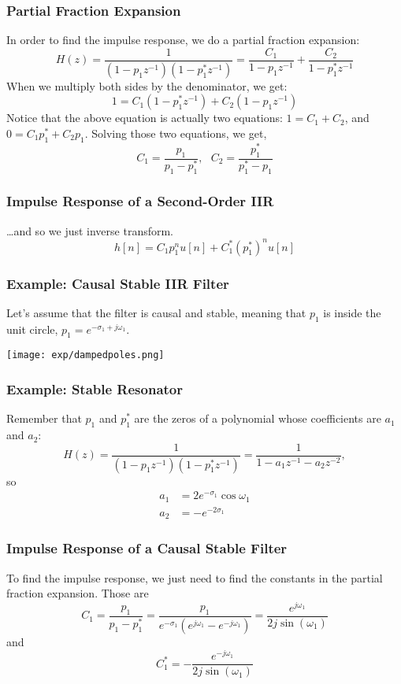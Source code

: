 \documentclass{beamer}
\begin{document}
\begin{frame}
  \frametitle{Partial Fraction Expansion}

  In order to find the impulse response, we do a partial fraction expansion:
  \[
  H(z) = \frac{1}{(1-p_1z^{-1})(1-p_1^*z^{-1})}= \frac{C_1}{1-p_1z^{-1}} + \frac{C_2}{1-p_1^*z^{-1}}
  \]
  When we multiply both sides by the denominator, we get:
  \begin{displaymath}
    1 = C_1(1-p_1^*z^{-1}) + C_2(1-p_1z^{-1})
  \end{displaymath}
  Notice that the above equation is actually two equations: $1=C_1+C_2$, and
  $0=C_1p_1^*+C_2p_1$.  Solving those two equations, we get,
  \begin{displaymath}
    C_1 = \frac{p_1}{p_1-p_1^*},~~~
    C_2 = \frac{p_1^*}{p_1^*-p_1}
  \end{displaymath}
\end{frame}

\begin{frame}
  \frametitle{Impulse Response of a Second-Order IIR}

  \ldots and so we just inverse transform.
  \[
  h[n] = C_1p_1^n u[n] + C_1^* (p_1^*)^n u[n]
  \]
\end{frame}

\begin{frame}
  \frametitle{Example: Causal Stable IIR Filter}

  Let's assume that the filter is causal and stable, meaning that
  $p_1$ is inside the unit circle, $p_1=e^{-\sigma_1+j\omega_1}$.

  \centerline{\texttt{[image: exp/dampedpoles.png]}}
\end{frame}

\begin{frame}
  \frametitle{Example: Stable Resonator}

  Remember that $p_1$ and $p_1^*$ are the zeros of a polynomial whose
  coefficients are $a_1$ and $a_2$:
  \begin{displaymath}
    H(z) = \frac{1}{(1-p_1z^{-1})(1-p_1^*z^{-1})}= \frac{1}{1-a_1z^{-1}-a_2z^{-2}},
  \end{displaymath}
  so
  \begin{align*}
    a_1  &= 2e^{-\sigma_1}\cos\omega_1\\
    a_2 &= -e^{-2\sigma_1}
  \end{align*}
\end{frame}

\begin{frame}
  \frametitle{Impulse Response of a Causal Stable Filter}

  To find the impulse response, we just need to find the constants in
  the partial fraction expansion.  Those are
  \begin{displaymath}
    C_1 = \frac{p_1}{p_1-p_1^*}= \frac{p_1}{e^{-\sigma_1}\left(e^{j\omega_1}-e^{-j\omega_1}\right)}
    = \frac{e^{j\omega_1}}{2j\sin(\omega_1)}
  \end{displaymath}
  and
  \[
  C_1^* = -\frac{e^{-j\omega_1}}{2j\sin(\omega_1)}
  \]
\end{frame}
\end{document}
